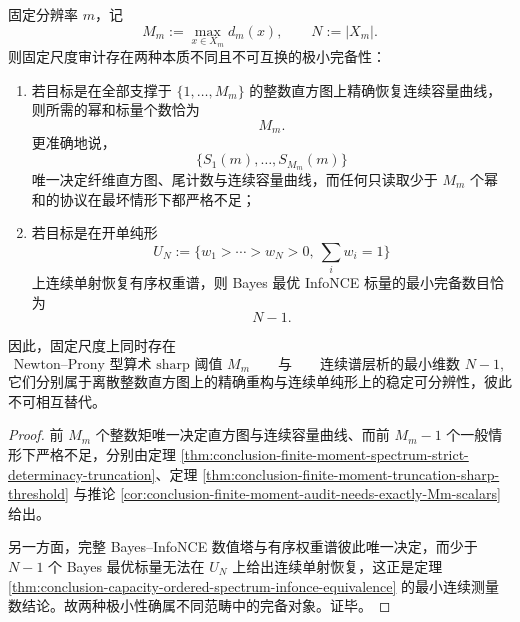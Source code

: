 \begin{theorem}\label{thm:conclusion-arithmetic-sharp-threshold-vs-continuous-minimality-split}
固定分辨率 \(m\)，记
\[
M_m:=\max_{x\in X_m}d_m(x),
\qquad
N:=|X_m|.
\]
则固定尺度审计存在两种本质不同且不可互换的极小完备性：
\begin{enumerate}
  \item 若目标是在全部支撑于 \(\{1,\dots,M_m\}\) 的整数直方图上精确恢复连续容量曲线，则所需的幂和标量个数恰为
  \[
  M_m.
  \]
  更准确地说，
  \[
  \{S_1(m),\dots,S_{M_m}(m)\}
  \]
  唯一决定纤维直方图、尾计数与连续容量曲线，而任何只读取少于 \(M_m\) 个幂和的协议在最坏情形下都严格不足；
  \item 若目标是在开单纯形
  \[
  U_N:=\{w_1>\cdots>w_N>0,\ \sum_i w_i=1\}
  \]
  上连续单射恢复有序权重谱，则 Bayes 最优 InfoNCE 标量的最小完备数目恰为
  \[
  N-1.
  \]
\end{enumerate}
因此，固定尺度上同时存在
\[
\text{Newton--Prony 型算术 sharp 阈值 }M_m
\qquad\text{与}\qquad
\text{连续谱层析的最小维数 }N-1,
\]
它们分别属于离散整数直方图上的精确重构与连续单纯形上的稳定可分辨性，彼此不可相互替代。
\end{theorem}
\begin{proof}
前 \(M_m\) 个整数矩唯一决定直方图与连续容量曲线、而前 \(M_m-1\) 个一般情形下严格不足，分别由定理 \ref{thm:conclusion-finite-moment-spectrum-strict-determinacy-truncation}、定理 \ref{thm:conclusion-finite-moment-truncation-sharp-threshold} 与推论 \ref{cor:conclusion-finite-moment-audit-needs-exactly-Mm-scalars} 给出。

另一方面，完整 Bayes--InfoNCE 数值塔与有序权重谱彼此唯一决定，而少于 \(N-1\) 个 Bayes 最优标量无法在 \(U_N\) 上给出连续单射恢复，这正是定理 \ref{thm:conclusion-capacity-ordered-spectrum-infonce-equivalence} 的最小连续测量数结论。故两种极小性确属不同范畴中的完备对象。证毕。
\end{proof}

